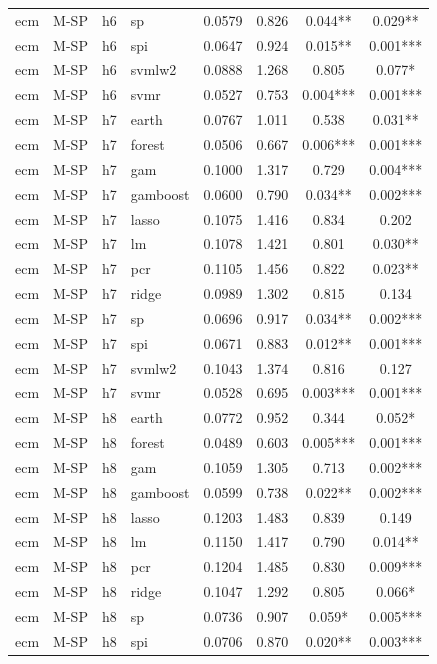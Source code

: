 \begin{ThreePartTable}
\begin{longtable}[t]{llclcccc}
ecm & M-SP & h6 & sp & 0.0579 & 0.826 & 0.044** & 0.029**\\
ecm & M-SP & h6 & spi & 0.0647 & 0.924 & 0.015** & 0.001***\\
ecm & M-SP & h6 & svmlw2 & 0.0888 & 1.268 & 0.805 & 0.077*\\
ecm & M-SP & h6 & svmr & 0.0527 & 0.753 & 0.004*** & 0.001***\\
\addlinespace
ecm & M-SP & h7 & earth & 0.0767 & 1.011 & 0.538 & 0.031**\\
ecm & M-SP & h7 & forest & 0.0506 & 0.667 & 0.006*** & 0.001***\\
ecm & M-SP & h7 & gam & 0.1000 & 1.317 & 0.729 & 0.004***\\
ecm & M-SP & h7 & gamboost & 0.0600 & 0.790 & 0.034** & 0.002***\\
ecm & M-SP & h7 & lasso & 0.1075 & 1.416 & 0.834 & 0.202\\
ecm & M-SP & h7 & lm & 0.1078 & 1.421 & 0.801 & 0.030**\\
ecm & M-SP & h7 & pcr & 0.1105 & 1.456 & 0.822 & 0.023**\\
ecm & M-SP & h7 & ridge & 0.0989 & 1.302 & 0.815 & 0.134\\
ecm & M-SP & h7 & sp & 0.0696 & 0.917 & 0.034** & 0.002***\\
ecm & M-SP & h7 & spi & 0.0671 & 0.883 & 0.012** & 0.001***\\
ecm & M-SP & h7 & svmlw2 & 0.1043 & 1.374 & 0.816 & 0.127\\
ecm & M-SP & h7 & svmr & 0.0528 & 0.695 & 0.003*** & 0.001***\\
\addlinespace
ecm & M-SP & h8 & earth & 0.0772 & 0.952 & 0.344 & 0.052*\\
ecm & M-SP & h8 & forest & 0.0489 & 0.603 & 0.005*** & 0.001***\\
ecm & M-SP & h8 & gam & 0.1059 & 1.305 & 0.713 & 0.002***\\
ecm & M-SP & h8 & gamboost & 0.0599 & 0.738 & 0.022** & 0.002***\\
ecm & M-SP & h8 & lasso & 0.1203 & 1.483 & 0.839 & 0.149\\
ecm & M-SP & h8 & lm & 0.1150 & 1.417 & 0.790 & 0.014**\\
ecm & M-SP & h8 & pcr & 0.1204 & 1.485 & 0.830 & 0.009***\\
ecm & M-SP & h8 & ridge & 0.1047 & 1.292 & 0.805 & 0.066*\\
ecm & M-SP & h8 & sp & 0.0736 & 0.907 & 0.059* & 0.005***\\
ecm & M-SP & h8 & spi & 0.0706 & 0.870 & 0.020** & 0.003***\\

\end{longtable}
\end{ThreePartTable}
